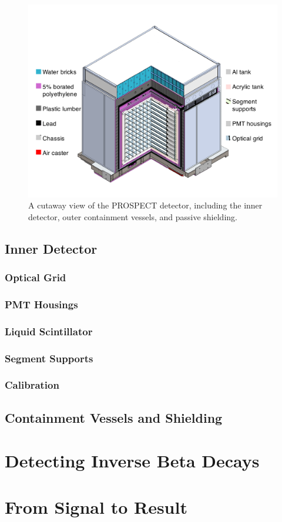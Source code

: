 \begin{figure}[t]
	\centering
	\includegraphics[width=0.8\linewidth]{tex/4-prospect-images/AD}
	\caption[Schematic of the PROSPECT detector]{A cutaway view of the PROSPECT detector, including the inner detector, outer containment vessels, and passive shielding.}
	\label{fig:ad}
\end{figure}

\subsection{Inner Detector}

\subsubsection{Optical Grid}
\subsubsection{PMT Housings}
\subsubsection{Liquid Scintillator}
\subsubsection{Segment Supports}
\subsubsection{Calibration}

\subsection{Containment Vessels and Shielding}


\section{Detecting Inverse Beta Decays}

\section{From Signal to Result}


